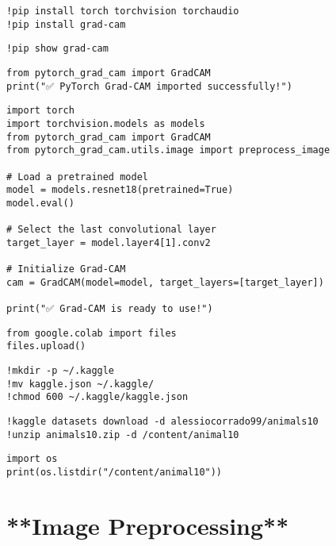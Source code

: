 \begin{verbatim}
!pip install torch torchvision torchaudio
!pip install grad-cam

\end{verbatim}

\begin{verbatim}
!pip show grad-cam

\end{verbatim}

\begin{verbatim}
from pytorch_grad_cam import GradCAM
print("✅ PyTorch Grad-CAM imported successfully!")

\end{verbatim}

\begin{verbatim}
import torch
import torchvision.models as models
from pytorch_grad_cam import GradCAM
from pytorch_grad_cam.utils.image import preprocess_image

# Load a pretrained model
model = models.resnet18(pretrained=True)
model.eval()

# Select the last convolutional layer
target_layer = model.layer4[1].conv2

# Initialize Grad-CAM
cam = GradCAM(model=model, target_layers=[target_layer])

print("✅ Grad-CAM is ready to use!")

\end{verbatim}

\begin{verbatim}
from google.colab import files
files.upload()
\end{verbatim}

\begin{verbatim}
!mkdir -p ~/.kaggle
!mv kaggle.json ~/.kaggle/
!chmod 600 ~/.kaggle/kaggle.json
\end{verbatim}

\begin{verbatim}
!kaggle datasets download -d alessiocorrado99/animals10
!unzip animals10.zip -d /content/animal10
\end{verbatim}

\begin{verbatim}
import os
print(os.listdir("/content/animal10"))
\end{verbatim}

\section{**Image Preprocessing**}

